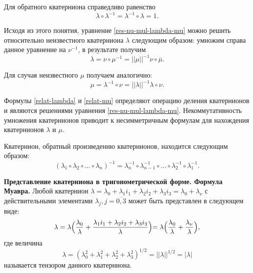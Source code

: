 \documentclass[14pt]{extreport}
\begin{document}
Для обратного кватерниона справедливо равенство
\begin{equation}
\lambda \circ \lambda^{-1} = \lambda^{-1} \circ \lambda = 1.
\end{equation}

Исходя из этого понятия, уравнение \eqref{res-nu-mul-lambda-mu} можно решить относительно неизвестного кватерниона $\lambda$ следующим образом: умножим справа данное уравнение на $\nu^{-1}$, в результате получим
\begin{equation}
\label{relat-lambda}
\lambda = \nu \circ \mu^{-1} = ||\mu||^{-1} \nu \circ \overline{\mu}.
\end{equation}

Для случая неизвестного $\mu$ получаем аналогично:
\begin{equation}
\label{relat-mu}
\mu = \lambda^{-1} \circ \nu = ||\lambda||^{-1} \lambda \circ \nu.
\end{equation}

Формулы \eqref{relat-lambda} и \eqref{relat-mu} определяют операцию деления кватернионов и являются решениями уравнения \eqref{res-nu-mul-lambda-mu}. Некоммутативность умножения кватернионов приводит к несимметричным формулам для нахождения кватернионов $\lambda$ и $\mu$.

Кватернион, обратный произведению кватернионов, находится следующим образом:
\begin{equation}
(\lambda_{1} \circ \lambda_{2} \circ \dots \circ \lambda_{n})^{-1} = \lambda_{n}^{-1} \circ \lambda_{n-1}^{-1}\circ \dots \circ \lambda_{2}^{-1}\circ \lambda_{1}^{-1}.
\end{equation}

\textbf{Представление кватерниона в тригонометрической форме. Формула Муавра.} Любой кватернион $\lambda = \lambda_{0} + \lambda_{1}i_{1} + \lambda_{2}i_{2} + \lambda_{3}i_{3} = \lambda_{0} + \lambda_{\nu}$ с действительными элементами $\lambda_{j}, j = \overline{0,3}$ может быть представлен в следующем виде:
\begin{equation}
\label{quat-lambda}
\lambda = \lambda \Bigl( \dfrac{\lambda_{0}}{\lambda} + \dfrac{\lambda_{1}i_{1}+\lambda_{2}i_{2}+\lambda_{3}i_{3}}{\lambda} \Bigl) = \lambda \Bigl( \dfrac{\lambda_{0}}{\lambda} + \dfrac{\lambda_{\nu}}{\lambda} \Bigl),
\end{equation}
где величина
\begin{equation}
\lambda = (\lambda_{0}^{2}+\lambda_{1}^{2}+\lambda_{2}^{2}+\lambda_{3}^{2})^{1/2} = ||\lambda||^{1/2} = |\lambda|
\end{equation}
называется тензором данного кватерниона.
\end{document}
